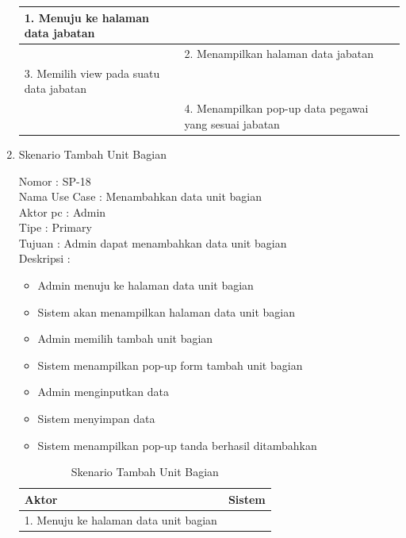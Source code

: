 \begin{enumerate}
\begin{table}
\begin{tabular}{ | p{59mm} | p{69mm}|}
		1.	Menuju ke halaman data jabatan &  \\
		
		\hline
		
		&  2.	Menampilkan halaman data jabatan \\
		
		\hline
		
		3. Memilih view pada suatu data jabatan & \\
		
		\hline
		
		& 4.	Menampilkan pop-up data pegawai yang sesuai jabatan\\
		\hline
		
	\end{tabular}
\end{table}
\newpage

\item Skenario Tambah Unit Bagian

Nomor \kern 3.6pc : SP-18 \\
Nama Use Case : Menambahkan data unit bagian \\
Aktor  pc : Admin \\
Tipe \kern 4.6pc : Primary \\
Tujuan \kern 3.6pc : Admin dapat menambahkan data unit bagian \\
Deskripsi \kern 2.5pc : 

\begin{itemize}
	\item Admin menuju ke halaman data unit bagian
	\item Sistem akan menampilkan halaman data unit bagian
	\item Admin memilih tambah unit bagian
	\item Sistem menampilkan pop-up form tambah unit bagian
	\item Admin menginputkan data
	\item Sistem menyimpan data
	\item Sistem menampilkan pop-up tanda berhasil ditambahkan
	
\end{itemize}

\begin{table}
	\caption{Skenario Tambah Unit Bagian}
	\centering
	\begin{tabular}{ | p{55mm} | p{73mm} |}
		\hline 
		\textbf{Aktor} & \textbf{Sistem} \\
		\hline
		
		1.	Menuju ke halaman data unit bagian &  \\
		

\end{tabular}
\end{table}
\end{enumerate}
